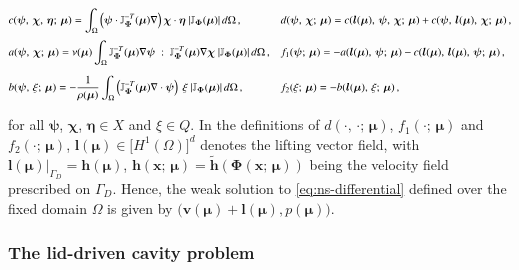\documentclass[longtitle]{elsarticle}
\numberwithin{equation}{section}
\theoremstyle{theorem}
\theoremstyle{definition}
\theoremstyle{remark}
\theoremstyle{proposition}
\numberwithin{figure}{section}
\newcommand{\wt}[1]{\widetilde{#1}}
\newcommand{\bg}[1]{\boldsymbol{#1}}
\begin{document}
		\begin{linenomath}\begin{equation*}
			\begin{aligned}
				& c(\bg{\psi}, \, \bg{\chi}, \, \bg{\eta}; \, \bg{\mu}) = \int_{\Omega} \left( \bg{\psi} \cdot \mathbb{J}^{-T}_{\bg{\Phi}}(\bg{\mu}) \nabla \right) \bg{\chi} \cdot \bg{\eta} ~ \lvert \mathbb{J}_{\bg{\Phi}}(\bg{\mu}) \rvert \, d \Omega \, , \qquad && d(\bg{\psi}, \, \bg{\chi}; \, \bg{\mu}) = c(\bg{l}(\bg{\mu}), \, \bg{\psi}, \, \bg{\chi}; \, \bg{\mu}) + c(\bg{\psi}, \, \bg{l}(\bg{\mu}), \, \bg{\chi}; \, \bg{\mu}) \, , \\[0.1cm]
				& a(\bg{\psi}, \, \bg{\chi}; \, \bg{\mu}) = \nu(\bg{\mu}) \int_{\Omega} \mathbb{J}^{-T}_{\bg{\Phi}}(\bg{\mu}) \nabla \bg{\psi} ~ : ~ \mathbb{J}^{-T}_{\bg{\Phi}}(\bg{\mu}) \nabla \bg{\chi} ~ \lvert \mathbb{J}_{\bg{\Phi}}(\bg{\mu}) \rvert \, d \Omega \, , && f_1(\bg{\psi}; \, \bg{\mu}) = - a(\bg{l}(\bg{\mu}), \, \bg{\psi}; \, \bg{\mu}) - c(\bg{l}(\bg{\mu}), \, \bg{l}(\bg{\mu}), \, \bg{\psi}; \, \bg{\mu}) \, , \\[0.2cm]
				& b(\bg{\psi}, \, \xi; \, \bg{\mu}) = - \dfrac{1}{\rho(\bg{\mu})} \int_{\Omega} \left( \mathbb{J}^{-T}_{\bg{\Phi}}(\bg{\mu}) \nabla \cdot \bg{\psi} \right) ~ \xi ~ \lvert \mathbb{J}_{\bg{\Phi}}(\bg{\mu}) \rvert \, d \Omega \, , && f_2(\xi; \, \bg{\mu}) = - b(\bg{l}(\bg{\mu}), \, \xi; \, \bg{\mu}) \, ,
			\end{aligned}
			\vspace*{-0.1cm}
		\end{equation*}\end{linenomath}
		for all $\bg{\psi}$, $\bg{\chi}$, $\bg{\eta} \in X$ and $\xi \in Q$. In the definitions of $d(\cdot, \, \cdot; \, \bg{\mu})$, $f_1(\cdot; \, \bg{\mu})$ and $f_2(\cdot; \, \bg{\mu})$, $\bg{l}(\bg{\mu}) \in \big[ H^1(\Omega) \big]^d$ denotes the lifting vector field, with $\bg{l}(\bg{\mu}) \big\rvert_{\Gamma_D} = \bg{h}(\bg{\mu})$, $\bg{h}(\bg{x}; \, \bg{\mu}) = \wt{\bg{h}}(\bg{\Phi}(\bg{x}; \, \bg{\mu}))$ being the velocity field prescribed on $\Gamma_D$. Hence, the weak solution to \eqref{eq:ns-differential} defined over the fixed domain $\Omega$ is given by $\big( \bg{v}(\bg{\mu}) + \bg{l}(\bg{\mu}), p(\bg{\mu}) \big)$.
	
	
	
	\subsubsection{The lid-driven cavity problem}
	\label{section:The lid-driven cavity problem}
		
\end{document}
